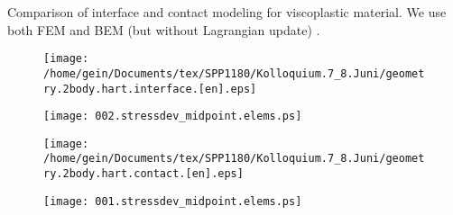 Comparison of interface and contact modeling for viscoplastic material. We  use both FEM and BEM (but without Lagrangian update) \cite{CGMS06pr80}.
\begin{figure}[h]
\begin{minipage}[c]{6cm}
\begin{center}
\texttt{[image: /home/gein/Documents/tex/SPP1180/Kolloquium.7\_8.Juni/geometry.2body.hart.interface.[en].eps]}

	\texttt{[image: 002.stressdev\_midpoint.elems.ps]}
\end{center}
\end{minipage}\hfill
\begin{minipage}[c]{6cm}
\begin{center}
\texttt{[image: /home/gein/Documents/tex/SPP1180/Kolloquium.7\_8.Juni/geometry.2body.hart.contact.[en].eps]}

	\texttt{[image: 001.stressdev\_midpoint.elems.ps]}
\end{center}
\end{minipage}
\end{figure}

